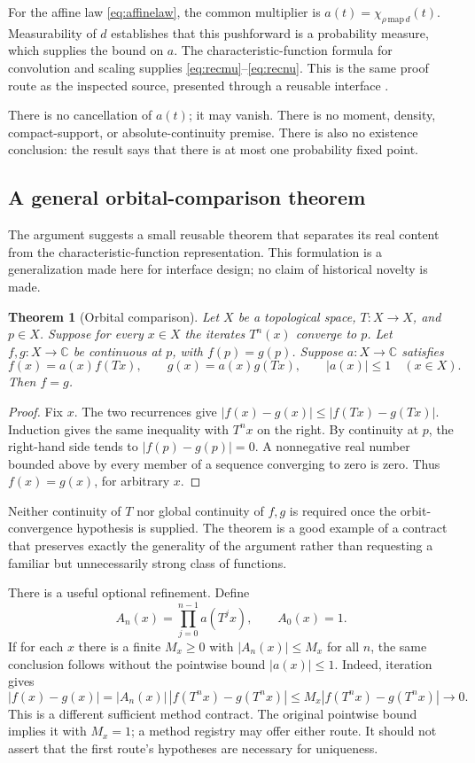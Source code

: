 \documentclass[11pt,a4paper]{article}
\newcommand{\C}{\mathbb C}
\newtheorem{theorem}{Theorem}[section]
\theoremstyle{definition}
\begin{document}
For the affine law \eqref{eq:affinelaw}, the common multiplier is
$a(t)=\chi_{\rho\,\mathrm{map}\,d}(t)$. Measurability of $d$ establishes that
this pushforward is a probability measure, which supplies the bound on $a$.
The characteristic-function formula for convolution and scaling supplies
\eqref{eq:recmu}--\eqref{eq:recnu}. This is the same proof route as the inspected
source, presented through a reusable interface \cite{affine}.

There is no cancellation of $a(t)$; it may vanish. There is no moment,
density, compact-support, or absolute-continuity premise. There is also no
existence conclusion: the result says that there is at most one probability
fixed point.

\subsection{A general orbital-comparison theorem}
The argument suggests a small reusable theorem that separates its real content
from the characteristic-function representation. This formulation is a
generalization made here for interface design; no claim of historical novelty
is made.

\begin{theorem}[Orbital comparison]\label{thm:orbit}
Let $X$ be a topological space, $T:X\to X$, and $p\in X$. Suppose for every
$x\in X$ the iterates $T^n(x)$ converge to $p$. Let $f,g:X\to\C$ be continuous
at $p$, with $f(p)=g(p)$. Suppose $a:X\to\C$ satisfies
\[
 f(x)=a(x)f(Tx),\qquad g(x)=a(x)g(Tx),\qquad |a(x)|\le1
 \quad(x\in X).
\]
Then $f=g$.
\end{theorem}
\begin{proof}
Fix $x$. The two recurrences give
$|f(x)-g(x)|\le |f(Tx)-g(Tx)|$. Induction gives the same inequality with
$T^n x$ on the right. By continuity at $p$, the right-hand side tends to
$|f(p)-g(p)|=0$. A nonnegative real number bounded above by every member of a
sequence converging to zero is zero. Thus $f(x)=g(x)$, for arbitrary $x$.
\end{proof}

Neither continuity of $T$ nor global continuity of $f,g$ is required once the
orbit-convergence hypothesis is supplied. The theorem is a good example of a
contract that preserves exactly the generality of the argument rather than
requesting a familiar but unnecessarily strong class of functions.

There is a useful optional refinement. Define
\[
 A_n(x)=\prod_{j=0}^{n-1}a(T^j x),\qquad A_0(x)=1.
\]
If for each $x$ there is a finite $M_x\ge0$ with $|A_n(x)|\le M_x$ for all
$n$, the same conclusion follows without the pointwise bound $|a(x)|\le1$.
Indeed, iteration gives
\[
 |f(x)-g(x)|=|A_n(x)|\,|f(T^n x)-g(T^n x)|
 \le M_x|f(T^n x)-g(T^n x)|\longrightarrow0.
\]
This is a different sufficient method contract. The original pointwise bound
implies it with $M_x=1$; a method registry may offer either route. It should not
assert that the first route's hypotheses are necessary for uniqueness.
\end{document}
